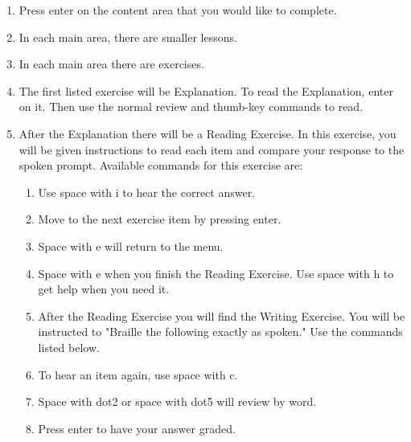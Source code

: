 \documentclass[10pt,letterpaper,twoside]{report}
\begin{document}
{{{{\begin{enumerate}
\begin{enumerate}
		      \item Integrals, Sigma Notation, and Limits
		            
		            
	      \end{enumerate}
	\item Press enter on the content area that you would like to complete.
	      
	\item In each main area, there are smaller lessons.
	      
	\item In each main area there are exercises.
	      
	\item The first listed exercise will be Explanation.  To read the Explanation, enter on it.  Then use the normal review and thumb-key commands to read.
	      
	\item After the Explanation there will be a Reading Exercise.  In this exercise, you will be given instructions to read each item and compare your response to the spoken prompt.  Available commands for this exercise are:
	      
	      \begin{enumerate}
		      \item Use space with i to hear the correct answer.
		            
		      \item Move to the next exercise item by pressing enter.
		            
		      \item Space with e will return to the menu.
		            
		      \item Space with e when you finish the Reading Exercise.  Use space with h to get help when you need it.
		            
		      \item After the Reading Exercise you will find the Writing Exercise.  You will be instructed to "Braille the following exactly as spoken." Use the commands listed below.
		            
		      \item To hear an item again, use space with c.
		            
		      \item Space with dot2 or space with dot5 will review by word.
		            
		      \item Press enter to have your answer graded.
		            

\end{enumerate}
\end{enumerate}}}}}
\end{document}
